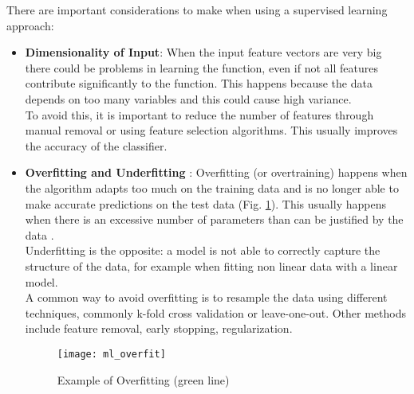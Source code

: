 There are important considerations to make when using a supervised learning approach:
\begin{itemize}
	\item \textbf{Dimensionality of Input}: When the input feature vectors are very big there could be problems in learning the function, even if not all features contribute significantly to the function. This happens because the data depends on too many variables and this could cause high variance. \\
	To avoid this, it is important to reduce the number of features through manual removal or using feature selection algorithms. This usually improves the accuracy of the classifier.
	\item \textbf{Overfitting and Underfitting} \cite{overfit}: Overfitting (or overtraining) happens when the algorithm adapts too much on the training data and is no longer able to make accurate predictions on the test data (Fig. \ref{fig:ml_overfit}). This usually happens when there is an excessive number of parameters than can be justified by the data \cite{camb_over}. \\
	Underfitting is the opposite: a model is not able to correctly capture the structure of the data, for example when fitting non linear data with a linear model. \\
	A common way to avoid overfitting is to resample the data using different techniques, commonly k-fold cross validation or leave-one-out. Other methods include feature removal, early stopping, regularization.
	
	\begin{figure}[H]
		\centering
		\texttt{[image: ml\_overfit]}
		\caption{Example of Overfitting (green line) \cite{wiki:ml_overfit}}
		\label{fig:ml_overfit}
	\end{figure}	
	

\end{itemize}
